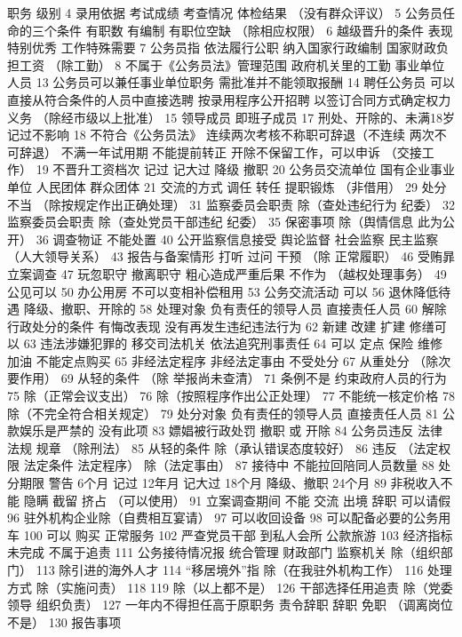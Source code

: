 \documentclass[cyan]{elegantnote}
\begin{document}
\begin{enumerate}
职务 级别
4 录用依据
考试成绩 考查情况 体检结果
（没有群众评议）
5 公务员任命的三个条件
有职数 有编制 有职位空缺
（除相应权限）
6 越级晋升的条件
表现特别优秀
工作特殊需要
7 公务员指
依法履行公职 纳入国家行政编制 国家财政负担工资
（除工勤）
8 不属于《公务员法》管理范围
政府机关里的工勤
事业单位人员
13 公务员可以兼任事业单位职务 需批准并不能领取报酬
14 聘任公务员
可以直接从符合条件的人员中直接选聘
按录用程序公开招聘
以签订合同方式确定权力义务
（除经市级以上批准）
15 领导成员 即班子成员
17 刑处、开除的、未满18岁
记过不影响
18 不符合《公务员法》
连续两次考核不称职可辞退（不连续 两次不可辞退）
不满一年试用期 不能提前转正
开除不保留工作，可以申诉
（交接工作）
19 不晋升工资档次
记过 记大过 降级 撤职
20 公务员交流单位
国有企业事业单位
人民团体
群众团体
21 交流的方式
调任 转任 提职锻炼
（非借用）
29 处分不当
（除按规定作出正确处理）
31 监察委员会职责
除（查处违纪行为 纪委）
32 监察委员会职责
除（查处党员干部违纪 纪委）
35 保密事项
除（舆情信息 此为公开）
36 调查物证 不能处置
40 公开监察信息接受
舆论监督 社会监察 民主监察
（人大领导关系）
43 报告与备案情形
打听 过问 干预
（除 正常履职）
46 受贿暃 立案调查
47 玩忽职守
撤离职守 粗心造成严重后果 不作为
（越权处理事务）
49 公见可以
50 办公用房
不可以变相补偿租用
53 公务交流活动 可以
56 退休降低待遇
降级、撤职、开除的
58 处理对象
负有责任的领导人员
直接责任人员
60 解除行政处分的条件
有悔改表现
没有再发生违纪违法行为
62 新建 改建 扩建
修缮可以
63 违法涉嫌犯罪的
移交司法机关
依法追究刑事责任
64 可以 定点
保险 维修 加油
不能定点购买
65 非经法定程序 非经法定事由 不受处分
67 从重处分
（除次要作用）
69 从轻的条件
（除 举报尚未查清）
71 条例不是
约束政府人员的行为
75 除（正常会议支出）
76 除（按照程序作出公正处理）
77 不能统一核定价格
78 除（不完全符合相关规定）
79 处分对象
负有责任的领导人员
直接责任人员
81 公款娱乐是严禁的 没有此项
83 嫖娼被行政处罚
撤职 或 开除
84 公务员违反
法律 法规 规章
（除刑法）
85 从轻的条件
除（承认错误态度较好）
86 违反 （法定权限 法定条件 法定程序）
除（法定事由）
87 接待中 不能拉回陪同人员数量
88 处分期限
警告 6个月
记过 12年月
记大过 18个月
降级、撤职 24个月
89 非税收入不能
隐瞒 截留 挤占
（可以使用）
91 立案调查期间
不能 交流 出境 辞职
可以请假
96 驻外机构企业除（自费相互宴请）
97 可以收回设备
98 可以配备必要的公务用车
100 可以 购买 正常服务
102 严查党员干部
到私人会所
公款旅游
103 经济指标未完成 不属于追责
111 公务接待情况报
统合管理 财政部门 监察机关
除（组织部门）
113 除引进的海外人才
114 “移居境外”指
除（在我驻外机构工作）
116 处理方式
除（实施问责）
118 119 除（以上都不是）
126 干部选择任用追责
除（党委领导 组织负责）
127 一年内不得担任高于原职务
责令辞职 辞职 免职
（调离岗位不是）
130 报告事项

\end{enumerate}
\end{document}
